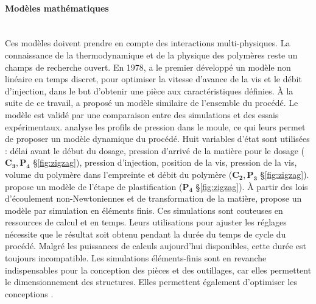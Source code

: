 \paragraph{Modèles mathématiques}\mbox{} \\
Ces modèles doivent prendre en compte des interactions multi-physiques.
La connaissance de la thermodynamique et de la physique des polymères reste un champs de recherche ouvert.
En 1978, \cite{shankar_dynamic_1978} a le premier développé un modèle non linéaire en temps discret, pour optimiser la vitesse d'avance de la vis et le débit d'injection, dans le but d’obtenir une pièce aux caractéristiques définies.
À la suite de ce travail, \cite{shankar_mathematical_1982} a proposé un modèle similaire de l'ensemble du procédé.
Le modèle est validé par une comparaison entre des simulations et des essais expérimentaux.
\cite{chiu_dynamic_1991} analyse les profils de pression dans le moule, ce qui leurs permet de proposer un modèle dynamique du procédé.
Huit variables d’état sont utilisées : délai avant le début du dosage, pression d’arrivé de la matière pour le dosage ($\boldsymbol{C_3, P_4}$ §\ref{fig:zigzag}), pression d’injection, position de la vis, pression de la vis, volume du polymère dans l’empreinte et débit du polymère ($\boldsymbol{C_2, P_3}$ §\ref{fig:zigzag}).
\cite{bereaux_series_2004} propose un modèle de l'étape de plastification ($\boldsymbol{P_4}$ §\ref{fig:zigzag}).
À partir des lois d'écoulement non-Newtoniennes et de transformation de la matière, \cite{moguedet_use_2009} propose un modèle par simulation en éléments finis.
Ces simulations sont couteuses en ressources de calcul et en temps.
Leurs utilisations pour ajuster les réglages nécessite que le résultat soit obtenu pendant la durée du temps de cycle du procédé.
Malgré les puissances de calculs aujourd’hui disponibles, cette durée
est toujours incompatible.
Les simulations éléments-finis sont en revanche indispensables pour la conception des pièces et des outillages, car elles permettent le dimensionnement des structures.
Elles permettent également d’optimiser les conceptions \cite{gao_adaptive_2008}.

